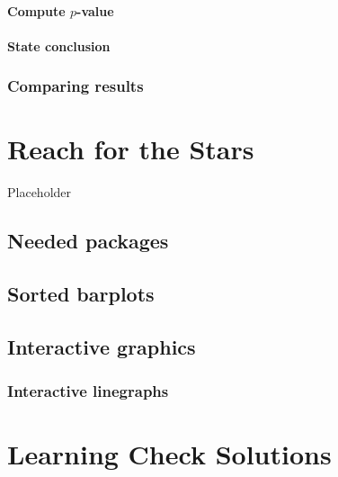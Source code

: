 \documentclass[12pt, krantz2,]{krantz}
\begin{document}
\hypertarget{compute-p-value-2}{%
\subsubsection*{\texorpdfstring{Compute \(p\)-value}{Compute p-value}}\label{compute-p-value-2}}


\hypertarget{state-conclusion-4}{%
\subsubsection*{State conclusion}\label{state-conclusion-4}}


\hypertarget{comparing-results-4}{%
\subsection{Comparing results}\label{comparing-results-4}}

\hypertarget{appendixC}{%
\chapter{Reach for the Stars}\label{appendixC}}

Placeholder

\hypertarget{needed-packages-11}{%
\section*{Needed packages}\label{needed-packages-11}}


\hypertarget{sorted-barplots}{%
\section{Sorted barplots}\label{sorted-barplots}}

\hypertarget{interactive-graphics}{%
\section{Interactive graphics}\label{interactive-graphics}}

\hypertarget{interactive-linegraphs}{%
\subsection{Interactive linegraphs}\label{interactive-linegraphs}}

\hypertarget{appendixD}{%
\chapter{Learning Check Solutions}\label{appendixD}}
\end{document}
